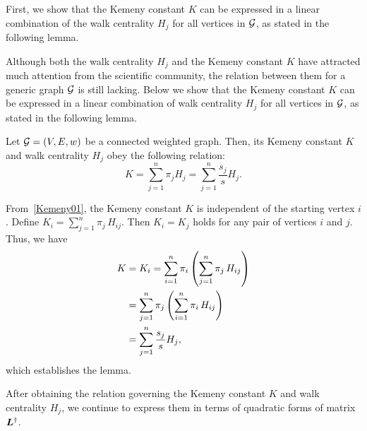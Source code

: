 \documentclass[10pt,journal,compsoc,twocolumn,twoside]{IEEEtran}
\begin{document}
First, we show that the Kemeny constant \(K\) can be expressed in a linear combination of the walk centrality  \(H_j\) for all vertices in \(\mathcal{G}\), as stated in the following lemma.

Although both the walk centrality \(H_j\) and the Kemeny constant \(K\) have attracted much attention from the scientific community, the relation between  them for a generic  graph  \(\mathcal{G}\) is still lacking. Below we show that the Kemeny constant \(K\) can be expressed in a linear combination of walk centrality  \(H_j\) for all vertices in \(\mathcal{G}\), as stated in the following lemma.

\begin{lemma}
    Let \(\mathcal{G}=(V,E,w)\) be a connected weighted graph. Then, its  Kemeny constant \(K\)  and walk centrality \(H_j\) obey the following relation:
    \begin{equation}\label{HjK01}
        K=\sum_{j=1}^{n} \pi_j H_j=\sum_{j=1}^{n} \frac{s_j}{s} H_j.
    \end{equation}
\end{lemma}
\begin{IEEEproof}
    From~\eqref{Kemeny01}, the Kemeny constant \(K\) is independent of the starting vertex \(i\). Define \(K_i =\sum_{j=1}^{n}\pi_j\,H_{ij}\). Then   \(K_i=K_j\) holds for any pair of vertices \(i\) and \(j\). Thus, we have
    \begin{align}\label{Kemeny02}
        K & =K_i =\sum_{i=1}^{n} \pi_i \left( \sum_{j=1}^{n}\pi_j\,H_{ij}\right) \notag \\
          & =\sum_{j=1}^{n} \pi_j \left( \sum_{i=1}^{n}\pi_i\,H_{ij}\right) \notag      \\
          & =\sum_{j=1}^{n} \frac{s_j}{s} H_j,\notag
    \end{align}
    which establishes the lemma.
\end{IEEEproof}

After obtaining the relation governing the Kemeny constant \(K\)  and walk centrality \(H_j\), we continue to express them in terms of quadratic forms of matrix  \(\boldsymbol{L}^{\dagger}\).
\end{document}
